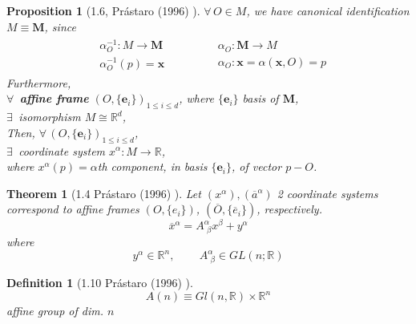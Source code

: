 \documentclass[10pt]{amsart}
\newtheorem{theorem}{Theorem}
\newtheorem{proposition}{Proposition}
\newtheorem{definition}{Definition}
\begin{document}
\begin{multicols*}{2}
\begin{proposition}[1.6, Pr\'{a}staro (1996) \cite{Pras1996}]
	$\forall \, O \in M$, we have canonical identification $M \equiv \mathbf{M}$, since
	\[
	\begin{gathered}
	\begin{aligned}
	& \alpha^{-1}_O:M \to \mathbf{M} \\
	& \alpha^{-1}_O(p) = \mathbf{x} 
	\end{aligned} \qquad \quad \, 
	\begin{aligned}
	& \alpha_O : \mathbf{M} \to M \\
	& \alpha_O: \mathbf{x} = \alpha(\mathbf{x}, O) = p
	\end{aligned}
	\end{gathered}
	\]
	Furthermore, \\
	$\forall \, $ \textbf{affine frame} $(O, \lbrace \mathbf{e}_i \rbrace)_{1\leq i \leq d}$, where $\lbrace \mathbf{e}_i \rbrace$ basis of $\mathbf{M}$, \\
	\phantom{Furthermore} $\exists \, $ isomorphism $M \cong \mathbb{R}^d$, \\
	Then, $\forall \, (O, \lbrace \mathbf{e}_i \rbrace)_{1 \leq i \leq d}$, \\
	\phantom{Then} $\exists \, $ coordinate system $x^{\alpha} : M \to \mathbb{R}$, \\
	\phantom{Then $\exists \, $} where $x^{\alpha}(p) = \alpha$th component, in basis $\lbrace \mathbf{e}_i \rbrace$, of vector $p - O$. 
	
	
	
\end{proposition}

\begin{theorem}[1.4 Pr\'{a}staro (1996) \cite{Pras1996}]
  Let $(x^{\alpha}), (\overline{a}^{\alpha})$ 2 coordinate systems correspond to affine frames $(O, \lbrace e_i \rbrace)$, $( \overline{O}, \lbrace \overline{e}_i \rbrace )$, respectively.
\begin{equation}
  \overline{x}^{\alpha} = A^{\alpha}_{ \, \, \beta} x^{\beta} + y^{\alpha}
\end{equation}
where
\[
y^{\alpha} \in \mathbb{R}^n, \qquad \, A^{\alpha}_{ \, \, \beta} \in GL(n; \mathbb{R})
\]
\end{theorem}

\begin{definition}[1.10 Pr\'{a}staro (1996) \cite{Pras1996}]
  \begin{equation}
    A(n) \equiv Gl(n,\mathbb{R}) \times \mathbb{R}^n
  \end{equation}
  affine group of dim. $n$
  \end{definition}


\end{multicols*}
\end{document}
